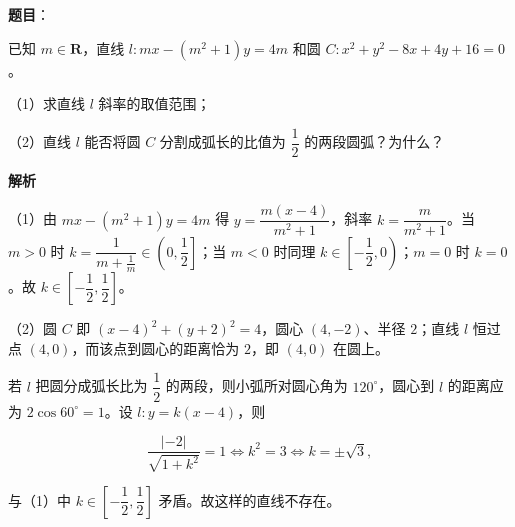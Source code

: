 \begin{answer}

\textbf{题目}：

已知 $m\in\mathbf R$，直线 $l:mx-(m^2+1)y=4m$ 和圆 $C:x^2+y^2-8x+4y+16=0$。

（1）求直线 $l$ 斜率的取值范围；

（2）直线 $l$ 能否将圆 $C$ 分割成弧长的比值为 $\dfrac12$ 的两段圆弧？为什么？

\textbf{解析}

（1）由 $mx-(m^2+1)y=4m$ 得 $y=\dfrac{m(x-4)}{m^2+1}$，斜率 $k=\dfrac{m}{m^2+1}$。当 $m>0$ 时 $k=\dfrac1{m+\frac1m}\in\left(0,\dfrac12\right]$；当 $m<0$ 时同理 $k\in\left[-\dfrac12,0\right)$；$m=0$ 时 $k=0$。故 $k\in\left[-\dfrac12,\dfrac12\right]$。

（2）圆 $C$ 即 $(x-4)^2+(y+2)^2=4$，圆心 $(4,-2)$、半径 $2$；直线 $l$ 恒过点 $(4,0)$，而该点到圆心的距离恰为 $2$，即 $(4,0)$ 在圆上。

若 $l$ 把圆分成弧长比为 $\dfrac12$ 的两段，则小弧所对圆心角为 $120^\circ$，圆心到 $l$ 的距离应为 $2\cos60^\circ=1$。设 $l:y=k(x-4)$，则

\nopagebreak[4]
\[\frac{\left|-2\right|}{\sqrt{1+k^2}}=1\iff k^2=3\iff k=\pm\sqrt3,\]

与（1）中 $k\in\left[-\dfrac12,\dfrac12\right]$ 矛盾。故这样的直线不存在。


\end{answer}

